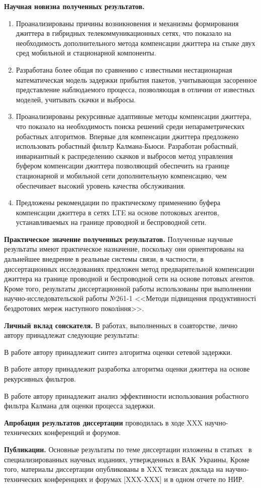 \textbf{Научная новизна полученных результатов.} 
\begin{enumerate}
  \item Проанализированы причины возникновения и механизмы формирования джиттера в гибридных телекоммуникационных сетях, 
  что показало на необходимость дополнительного метода компенсации джиттера на стыке двух сред мобильной и стационарной компоненты.
 

  \item Разработана более общая по сравнению с известными нестационарная математическая модель задержки прибытия пакетов,
  учитывающая засоренное представление наблюдаемого процесса, позволяющая в отличии от известных моделей, учитывать скачки и выбросы.
  \item 
  
  Проанализированы рекурсивные адаптивные методы компенсации джиттера, что показало на необходимость поиска решений среди непараметрических робастных алгоритмов. 
   Впервые для компенсации джиттера предложено использовать робастный фильтр Калмана-Бьюси.
  Разработан робастный, инвариантный к распределению скачков и выбросов метод управления буфером компенсации джиттера позволяющий обеспечить на границе стационарной и мобильной сети дополнительную компенсацию, чем обеспечивает высокий уровень качества обслуживания.
  \item Предложены рекомендации по практическому применению буфера компенсации джиттера в сетях LTE на основе потоковых агентов, устанавливаемых на границе проводной и беспроводной сети.
\end{enumerate}

\textbf{Практическое значение полученных результатов.} Полученные научные результаты имеют практическое назначение, поскольку они ориентированы на дальнейшее внедрение в реальные системы связи, в частности, в диссертационных исследованиях предложен метод предварительной компенсации джиттера на границе проводной и беспроводной сети на основе потовых агентов.
Кроме того, результаты диссертационной работы использованы при выполнении научно-исследовательской работы №261-1 <<Методи підвищення продуктивності бездротових мереж наступного покоління>>.


\textbf{Личный вклад соискателя.} В работах, выполненных в соавторстве, лично автору принадлежат следующие результаты: 

В работе \cite{my1} автору принадлежит синтез алгоритма оценки сетевой задержки.

В работе \cite{my2} автору принадлежит разработка алгоритма оценки джиттера на основе рекурсивных фильтров.

В работе \cite{my4} автору принадлежит анализ эффективности использования робастного фильтра Калмана для оценки процесса задержки.

\textbf{Апробация результатов диссертации} проводилась в ходе XXX научно-технических конференций и форумов. 


\textbf{Публикации.} Основные результаты по теме диссертации изложены в статьях~\cite{my1,my2,my3,my4,my5} в специализированных научных изданиях, утвержденных в ВАК~Украины, Кроме того, материалы диссертации опубликованы в XXX тезисах доклада на научно-технических конференциях и форумах [XXX-XXX] и в одном отчете по НИР.


\clearpage